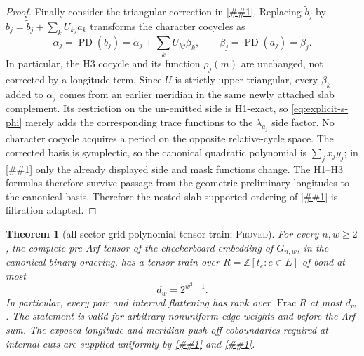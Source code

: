 \documentclass[11pt]{article}
\newcommand{\cref}[1]{\autoref{##1}}%
\newtheorem{theorem}{Theorem}[section]
\newcommand{\claimtag}[1]{\textsc{#1}}
\newcommand{\proved}{\claimtag{Proved}}
\begin{document}
\begin{proof}
Finally consider the triangular correction in \cref{lem:canonical}.
Replacing \(\widetilde b_j\) by
\(b_j=\widetilde b_j+\sum_kU_{kj}a_k\) transforms the character cocycles as
\begin{equation}\label{eq:triangular-character-transport}
 \alpha_j=\operatorname{PD}(b_j)
   =\widetilde\alpha_j+\sum_kU_{kj}\beta_k,
 \qquad
 \beta_j=\operatorname{PD}(a_j)=\widetilde\beta_j.
\end{equation}
In particular, the H3 cocycle and its function \(\rho_j(m)\) are unchanged,
not corrected by a longitude term.  Since \(U\) is strictly upper
triangular, every \(\beta_k\) added to \(\alpha_j\) comes from an earlier
meridian in the same newly attached slab complement.  Its restriction on
the un-emitted side is H1-exact, so \eqref{eq:explicit-s-phi} merely adds the
corresponding trace functions to the \(\lambda_{a_j}\) side factor.  No
character cocycle acquires a period on the opposite relative-cycle space.
The corrected basis is symplectic, so the canonical quadratic polynomial is
\(\sum_jx_jy_j\); in \cref{eq:grid-H2-internal} only the already displayed
side and mask functions change.  The H1--H3 formulas therefore survive
passage from the geometric preliminary longitudes to the canonical basis.
Therefore the nested slab-supported ordering of \cref{lem:canonical} is
filtration adapted.
\end{proof}

\begin{theorem}[all-sector grid polynomial tensor train; \proved]\label{thm:grid-upper}
For every \(n,w\geq2\), the complete pre-Arf tensor of the checkerboard
embedding of \(G_{n,w}\), in the canonical binary ordering, has a tensor
train over \(R=\mathbb Z[t_e:e\in E]\) of bond at most
\[
 d_w=2^{w^2-1}.
\]
In particular, every pair and internal flattening has rank over
\(\operatorname{Frac}R\) at most \(d_w\).  The statement is valid for
arbitrary nonuniform edge weights and before the Arf sum.  The exposed
longitude and meridian push-off coboundaries required at internal cuts are
supplied uniformly by
\cref{lem:planar-arc} and \cref{lem:grid-exact}.
\end{theorem}
\end{document}
